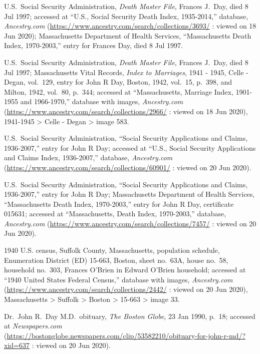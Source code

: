 \begin{thebibliography}{999}
U.S.\ Social Security Administration, \textit{Death Master File}, Frances J.\ Day, died 8 Jul 1997; accessed at ``U.S., Social Security Death Index, 1935-2014,'' database, \textit{Ancestry.com} (\url{https://www.ancestry.com/search/collections/3693/} : viewed on 18 Jun 2020); Massachusetts Department of Health Services, ``Massachusetts Death Index, 1970-2003,'' entry for Frances Day, died 8 Jul 1997.

U.S.\ Social Security Administration, \textit{Death Master File}, Frances J.\ Day, died 8 Jul 1997; Massachusetts Vital Records, \textit{Index to Marriages}, 1941 - 1945, Celle - Degan, vol.\ 129, entry for John R Day, Boston, 1942, vol.\ 15, p.\ 398, and Milton, 1942, vol.\ 80, p.\ 344; accessed at ``Massachusetts, Marriage Index, 1901-1955 and 1966-1970,'' database with images, \textit{Ancestry.com} (\url{https://www.ancestry.com/search/collections/2966/} : viewed on 18 Jun 2020), 1941-1945 > Celle - Degan > image 583.

U.S.\ Social Security Administration, ``Social Security Applications and Claims, 1936-2007,'' entry for John R Day; accessed at ``U.S., Social Security Applications and Claims Index, 1936-2007,'' database, \textit{Ancestry.com} (\url{https://www.ancestry.com/search/collections/60901/} : viewed on 20 Jun 2020).

U.S.\ Social Security Administration, ``Social Security Applications and Claims, 1936-2007,'' entry for John R Day; Massachusetts Department of Health Services, ``Massachusetts Death Index, 1970-2003,'' entry for John R Day, certificate 015631; accessed at ``Massachusetts, Death Index, 1970-2003,'' database, \textit{Ancestry.com} (\url{https://www.ancestry.com/search/collections/7457/} : viewed on 20 Jun 2020).

1940 U.S. census, Suffolk County, Massachusetts, population schedule, Enumeration District (ED) 15-663, Boston, sheet no.\ 63A, house no.\ 58, household no.\ 303, Frances O'Brien in Edward O'Brien household; accessed at ``1940 United States Federal Census,'' database with images, \textit{Ancestry.com} (\url{https://www.ancestry.com/search/collections/2442/} : viewed on 20 Jun 2020), Massachusetts > Suffolk > Boston > 15-663 > image 33.

Dr.\ John R.\ Day M.D.\ obituary, \textit{The Boston Globe}, 23 Jan 1990, p.\ 18; accessed at \textit{Newspapers.com} (\url{https://bostonglobe.newspapers.com/clip/53582210/obituary-for-john-r-md/?xid=637} : viewed on 20 Jun 2020).


\end{thebibliography}
